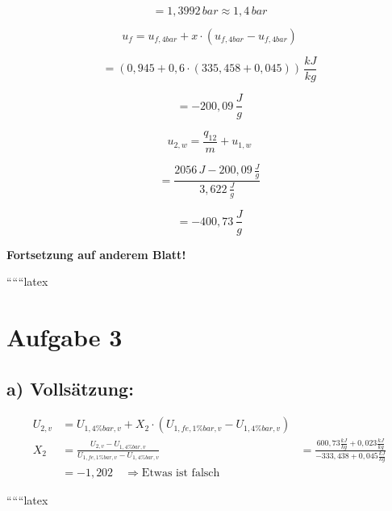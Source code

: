 \[
= 1,3992 \, bar \approx 1,4 \, bar
\]

\[
u_f = u_{f,4bar} + x \cdot (u_{f,4bar} - u_{f,4bar})
\]

\[
= (0,945 + 0,6 \cdot (335,458 + 0,045)) \, \frac{kJ}{kg}
\]

\[
= -200,09 \, \frac{J}{g}
\]

\[
u_{2,w} = \frac{q_{12}}{m} + u_{1,w}
\]

\[
= \frac{2056 \, J - 200,09 \, \frac{J}{g}}{3,622 \, \frac{J}{g}}
\]

\[
= -400,73 \, \frac{J}{g}
\]

\textbf{Fortsetzung auf anderem Blatt!}

``````latex


\section*{Aufgabe 3}
\subsection*{a) Vollsätzung:}

\begin{align*}
U_{2,v} &= U_{1,4\%bar,v} + X_2 \cdot \left( U_{1,fe,1\%bar,v} - U_{1,4\%bar,v} \right) \\
X_2 &= \frac{U_{2,v} - U_{1,4\%bar,v}}{U_{1,fe,1\%bar,v} - U_{1,4\%bar,v}} &= \frac{600,73 \frac{kJ}{kg} + 0,023 \frac{kJ}{kg}}{-333,438 + 0,045 \frac{kJ}{kg}} \\
&= -1,202 \quad \Rightarrow \text{Etwas ist falsch}
\end{align*}

``````latex


